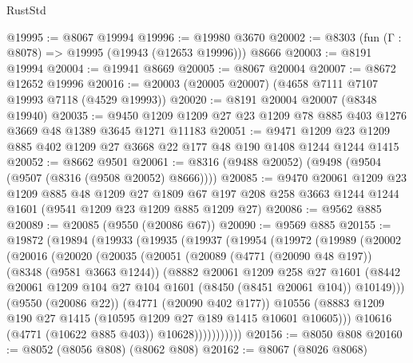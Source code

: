 \begin{lexlean}{RustStd}
\begin{coremodule}
@19995 := @8067 @19994
@19996 := @19980 @3670
@20002 := @8303 (fun (Γ : @8078) => @19995 (@19943 (@12653 @19996))) @8666
@20003 := @8191 @19994
@20004 := @19941 @8669
@20005 := @8067 @20004
@20007 := @8672 @12652 @19996
@20016 := @20003 (@20005 @20007) (@4658 @7111 @7107 @19993 @7118 (@4529 @19993))
@20020 := @8191 @20004 @20007 (@8348 @19940)
@20035 := @9450 @1209 @1209 @27 @23 @1209 @78 @885 @403 @1276 @3669 @48 @1389 @3645 @1271 @11183
@20051 := @9471 @1209 @23 @1209 @885 @402 @1209 @27 @3668 @22 @177 @48 @190 @1408 @1244 @1244 @1415
@20052 := @8662 @9501
@20061 := @8316 (@9488 @20052) (@9498 (@9504 (@9507 (@8316 (@9508 @20052) @8666))))
@20085 := @9470
    @20061
    @1209
    @23
    @1209
    @885
    @48
    @1209
    @27
    @1809
    @67
    @197
    @208
    @258
    @3663
    @1244
    @1244
    @1601
    (@9541 @1209 @23 @1209 @885 @1209 @27)
@20086 := @9562 @885
@20089 := @20085 (@9550 (@20086 @67))
@20090 := @9569 @885
@20155 := @19872
    (@19894
      (@19933
        (@19935
          (@19937
            (@19954
              (@19972
                (@19989
                  (@20002
                    (@20016
                      (@20020
                        (@20035
                          (@20051
                            (@20089
                              (@4771 (@20090 @48 @197))
                              (@8348 (@9581 @3663 @1244))
                              (@8882
                                @20061
                                @1209
                                @258
                                @27
                                @1601
                                (@8442
                                  @20061
                                  @1209
                                  @104
                                  @27
                                  @104
                                  @1601
                                  (@8450 (@8451 @20061 @104))
                                  @10149)))
                            (@9550 (@20086 @22))
                            (@4771 (@20090 @402 @177))
                            @10556
                            (@8883
                              @1209
                              @190
                              @27
                              @1415
                              (@10595 @1209 @27 @189 @1415 @10601 @10605)))
                          @10616
                          (@4771 (@10622 @885 @403))
                          @10628)))))))))))
@20156 := @8050 @808
@20160 := @8052 (@8056 @808) (@8062 @808)
@20162 := @8067 (@8026 @8068)

\end{coremodule}
\end{lexlean}
